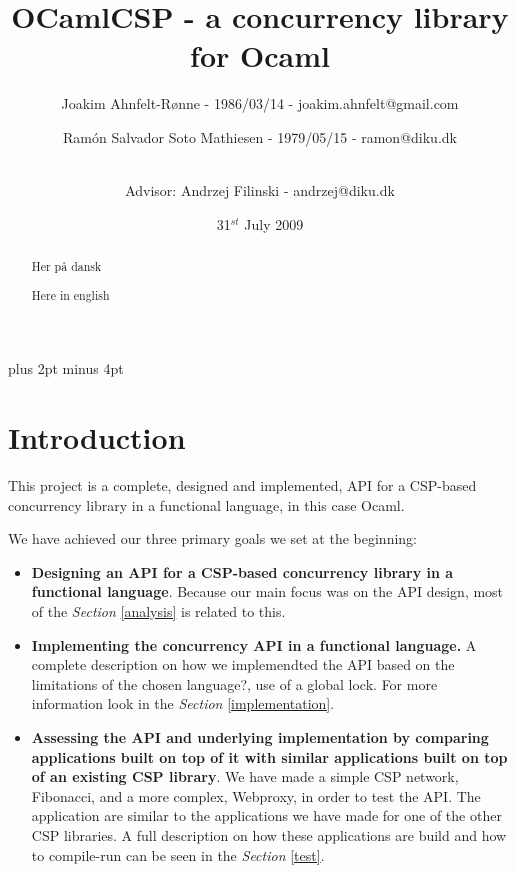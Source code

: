 \documentclass[a4paper,12pt]{article}
\title{OCamlCSP - a concurrency library for Ocaml}
\author{Joakim Ahnfelt-Rønne - 1986/03/14 - joakim.ahnfelt@gmail.com \and 
        Ramón Salvador Soto Mathiesen - 1979/05/15 - ramon@diku.dk \and
        \\ Advisor: Andrzej Filinski - andrzej@diku.dk}
\date{31$^{st}$ July 2009}
\begin{document}
\maketitle

\newpage

\begin{abstract}
Her på dansk
\end{abstract}

\begin{abstract}
Here in english
\end{abstract}

\newpage
\tableofcontents
\newpage

\parindent=0pt
\parskip=8pt plus 2pt minus 4pt

\section{Introduction}
This project is a complete, designed and implemented, API for a CSP-based
concurrency library in a functional language, in this case Ocaml\cite{?}.

We have achieved our three primary goals we set at the beginning:
\begin{itemize}
 \item \textbf{Designing an API for a CSP-based concurrency library in a
     functional language}. Because our main focus was on the API design, most of
   the {\it Section} \ref{analysis} is related to this.
 \item \textbf{Implementing the concurrency API in a functional language.} A
   complete description on how we implemendted the API based on the limitations
   of the chosen language?, use of a global lock. For more information look in
   the {\it Section} \ref{implementation}.
 \item \textbf{Assessing the API and underlying implementation by comparing
     applications built on top of it with similar applications built on top of
     an existing CSP library}. We have made a simple CSP network, Fibonacci,
   and a more complex, Webproxy, in order to test the API. The application are
   similar to the applications we have made for one of the other CSP libraries.
   A full description on how these applications are build and how to compile-run
   can be seen in the {\it Section} \ref{test}.
\end{itemize}
\end{document}
